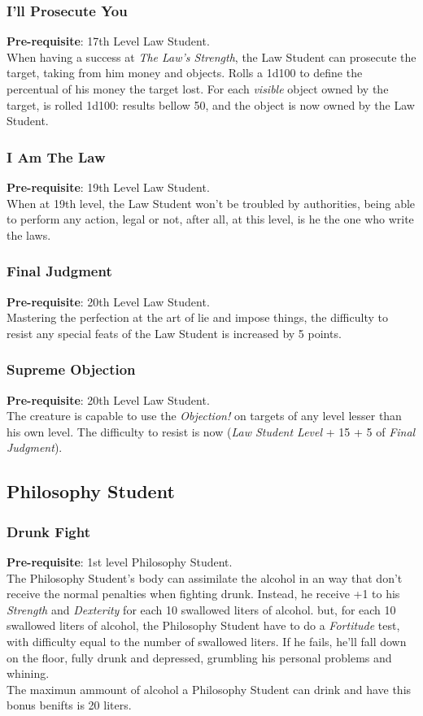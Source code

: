 \documentclass[ letterpaper,12pt]{article}
\begin{document}
\subsubsection{I'll Prosecute You}
{\bf Pre-requisite}: 17th Level Law Student.\\
When having a success at {\it The Law's Strength}, the Law Student can prosecute the target, taking from him money and objects. Rolls a 1d100 to define the percentual of his money the target lost. For each {\it visible} object owned by the target, is rolled 1d100: results bellow 50, and the object is now owned by the Law Student.

\subsubsection{I Am The Law}
{\bf Pre-requisite}: 19th Level Law Student.\\
When at 19th level, the Law Student won't be troubled by authorities, being able to perform any action, legal or not, after all, at this level, is he the one who write the laws.

\subsubsection{Final Judgment}
{\bf Pre-requisite}: 20th Level Law Student.\\
Mastering the perfection at the art of lie and impose things, the difficulty to resist any special feats of the Law Student is increased by 5 points.

\subsubsection{Supreme Objection}
{\bf Pre-requisite}: 20th Level Law Student.\\
The creature is capable to use the {\it Objection!} on targets of any level lesser than his own level.  The difficulty to resist is now ({\it Law Student Level} + 15 + 5 of {\it Final Judgment}).

\subsection{Philosophy Student}

\subsubsection{Drunk Fight}
 {\bf Pre-requisite}: 1st level Philosophy Student.\\
The Philosophy Student's body can assimilate the alcohol in an way that don't receive the normal penalties when fighting drunk. Instead, he receive +1 to his {\it Strength} and {\it Dexterity} for each 10 swallowed liters of alcohol. but, for each 10 swallowed liters of alcohol, the Philosophy Student have to do a {\it Fortitude} test, with difficulty equal to the number of swallowed liters. If he fails, he'll fall down on the floor, fully drunk and depressed, grumbling his personal problems and whining.\\
The maximun ammount of alcohol a Philosophy Student can drink and have this bonus benifts is 20 liters.
\end{document}
